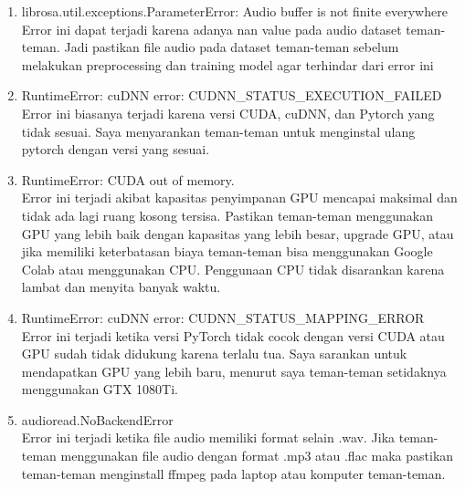 \begin{enumerate}

\item librosa.util.exceptions.ParameterError: Audio buffer is not finite everywhere \\
Error ini dapat terjadi karena adanya nan value pada audio dataset teman-teman. Jadi pastikan file audio pada dataset teman-teman sebelum melakukan preprocessing dan training model agar terhindar dari error ini

\item RuntimeError: cuDNN error: CUDNN\_STATUS\_EXECUTION\_FAILED \\
Error ini biasanya terjadi karena versi CUDA, cuDNN, dan Pytorch yang tidak sesuai. Saya menyarankan teman-teman untuk menginstal ulang pytorch dengan versi yang sesuai.

\item RuntimeError: CUDA out of memory. \\
Error ini terjadi akibat kapasitas penyimpanan GPU mencapai maksimal dan tidak ada lagi ruang kosong tersisa. Pastikan teman-teman menggunakan GPU yang lebih baik dengan kapasitas yang lebih besar, upgrade GPU, atau jika memiliki keterbatasan biaya teman-teman bisa menggunakan Google Colab atau menggunakan CPU. Penggunaan CPU tidak disarankan karena lambat dan menyita banyak waktu.

\item RuntimeError: cuDNN error: CUDNN\_STATUS\_MAPPING\_ERROR \\
Error ini terjadi ketika versi PyTorch tidak cocok dengan versi CUDA atau GPU sudah tidak didukung karena terlalu tua. Saya sarankan untuk mendapatkan GPU yang lebih baru, menurut saya teman-teman setidaknya menggunakan GTX 1080Ti.

\item audioread.NoBackendError \\
Error ini terjadi ketika file audio memiliki format selain .wav. Jika teman-teman menggunakan file audio dengan format .mp3 atau .flac maka pastikan teman-teman menginstall ffmpeg pada laptop atau komputer teman-teman.


\end{enumerate}
